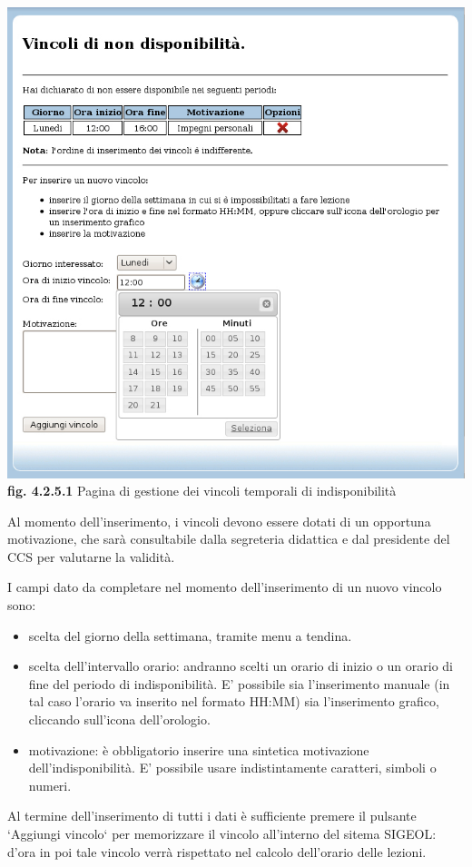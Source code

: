 \documentclass[11pt,a4paper]{article}
\begin{document}
\begin{center}
	\includegraphics[scale=0.5]{images/vincoli_docente.jpg}\\
	\textbf{fig. 4.2.5.1} Pagina di gestione dei vincoli temporali di indisponibilità\\
\end{center}
\bigskip

Al momento dell'inserimento, i vincoli devono essere dotati di un opportuna motivazione, che sarà consultabile dalla segreteria didattica e dal presidente del CCS per valutarne la validità.

I campi dato da completare nel momento dell'inserimento di un nuovo vincolo sono:
\begin{itemize}
 \item scelta del giorno della settimana, tramite menu a tendina.
 \item scelta dell'intervallo orario: andranno scelti un orario di inizio o un orario di fine del periodo di indisponibilità. E' possibile sia l'inserimento manuale (in tal caso l'orario va inserito nel formato HH:MM) sia l'inserimento grafico, cliccando sull'icona dell'orologio.
 \item motivazione: è obbligatorio inserire una sintetica motivazione dell'indisponibilità. E' possibile usare indistintamente caratteri, simboli o numeri.
\end{itemize}
Al termine dell'inserimento di tutti i dati è sufficiente premere il pulsante `Aggiungi vincolo` per memorizzare il vincolo all'interno del sitema SIGEOL: d'ora in poi tale vincolo verrà rispettato nel calcolo dell'orario delle lezioni.
\end{document}

